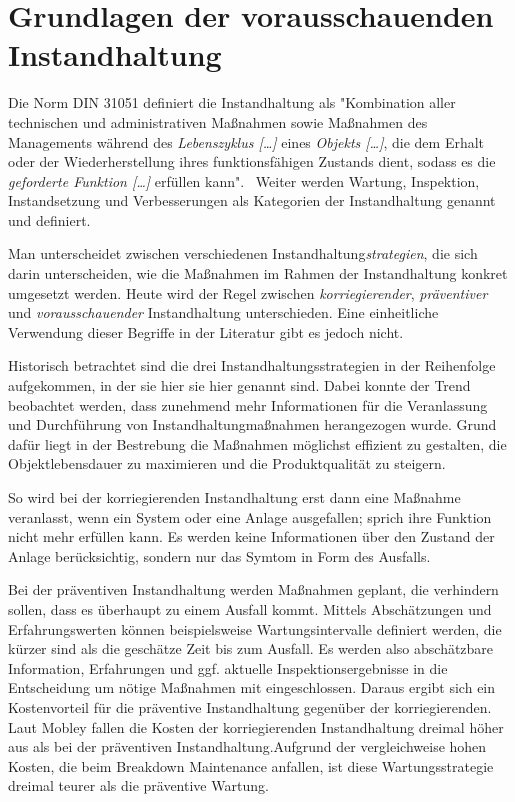 \chapter{Grundlagen der vorausschauenden Instandhaltung}
\label{ch:grundlagen_pdm}

Die Norm DIN 31051 definiert die Instandhaltung als "Kombination aller technischen und administrativen Maßnahmen sowie Maßnahmen des Managements während des \textit{Lebenszyklus […]} eines \textit{Objekts […]}, die dem Erhalt oder der Wiederherstellung ihres funktionsfähigen Zustands dient, sodass es die \textit{geforderte Funktion […]} erfüllen kann".~\cite[S.~4]{DIN.2019} Weiter werden Wartung, Inspektion, Instandsetzung und Verbesserungen als Kategorien der Instandhaltung genannt und definiert. 

Man unterscheidet zwischen verschiedenen Instandhaltung\textit{strategien}, die sich darin unterscheiden, wie die Maßnahmen im Rahmen der Instandhaltung konkret umgesetzt werden. Heute wird der Regel zwischen \textit{korriegierender}, \textit{präventiver} und \textit{vorausschauender} Instandhaltung unterschieden. Eine einheitliche Verwendung dieser Begriffe in der Literatur gibt es jedoch nicht.

Historisch betrachtet sind die drei  Instandhaltungsstrategien in der Reihenfolge aufgekommen, in der sie hier sie hier genannt sind. Dabei konnte der Trend beobachtet werden, dass zunehmend mehr Informationen für die Veranlassung und Durchführung von Instandhaltungmaßnahmen herangezogen wurde. Grund dafür liegt in der Bestrebung die Maßnahmen möglichst effizient zu gestalten, die Objektlebensdauer zu maximieren und die Produktqualität zu steigern. 

So wird bei der korriegierenden Instandhaltung erst dann eine Maßnahme veranlasst, wenn ein System oder eine Anlage ausgefallen; sprich ihre Funktion nicht mehr erfüllen kann. Es werden keine Informationen über den Zustand der Anlage berücksichtig, sondern nur das Symtom in Form des Ausfalls.

Bei der präventiven Instandhaltung werden Maßnahmen geplant, die verhindern sollen, dass es überhaupt zu einem Ausfall kommt. Mittels Abschätzungen und Erfahrungswerten können beispielsweise Wartungsintervalle definiert werden, die kürzer sind als die geschätze Zeit bis zum Ausfall. Es werden also abschätzbare Information, Erfahrungen und ggf. aktuelle Inspektionsergebnisse in die Entscheidung um nötige Maßnahmen mit eingeschlossen. Daraus ergibt sich ein Kostenvorteil für die präventive Instandhaltung gegenüber der korriegierenden. Laut Mobley fallen die Kosten der korriegierenden Instandhaltung dreimal höher aus als bei der präventiven Instandhaltung.Aufgrund der vergleichweise hohen Kosten, die beim Breakdown Maintenance anfallen, ist diese Wartungsstrategie dreimal teurer als die präventive Wartung.~\cite[S.~3]{Mobley.2002}

